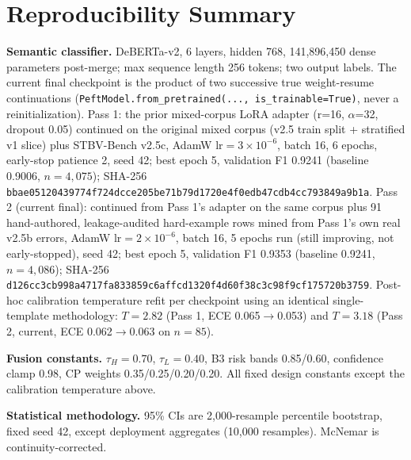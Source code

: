 \documentclass[conference]{IEEEtran}
\begin{document}
\section{Reproducibility Summary}
\label{app:params}
\textbf{Semantic classifier.} DeBERTa-v2, 6 layers, hidden 768, 141,896,450 dense parameters post-merge; max sequence length 256 tokens; two output labels. The current final checkpoint is the product of two successive true weight-resume continuations (\texttt{PeftModel.from\_pretrained(..., is\_trainable=True)}, never a reinitialization). Pass 1: the prior mixed-corpus LoRA adapter (r=16, $\alpha$=32, dropout 0.05) continued on the original mixed corpus (v2.5 train split + stratified v1 slice) plus STBV-Bench v2.5c, AdamW lr$=3\times10^{-6}$, batch 16, 6 epochs, early-stop patience 2, seed 42; best epoch 5, validation F1 0.9241 (baseline 0.9006, $n{=}4{,}075$); SHA-256 \texttt{bbae05120439774f724dcce205be71b79d1720e4f0edb47cdb4cc793849a9b1a}. Pass 2 (current final): continued from Pass 1's adapter on the same corpus plus 91 hand-authored, leakage-audited hard-example rows mined from Pass 1's own real v2.5b errors, AdamW lr$=2\times10^{-6}$, batch 16, 5 epochs run (still improving, not early-stopped), seed 42; best epoch 5, validation F1 0.9353 (baseline 0.9241, $n{=}4{,}086$); SHA-256 \texttt{d126cc3cb998a4717fa833859c6affcd1320f4d60f38c3c98f9cf175720b3759}. Post-hoc calibration temperature refit per checkpoint using an identical single-template methodology: $T{=}2.82$ (Pass 1, ECE 0.065$\to$0.053) and $T{=}3.18$ (Pass 2, current, ECE 0.062$\to$0.063 on $n{=}85$).

\textbf{Fusion constants.} $\tau_H{=}0.70$, $\tau_L{=}0.40$, B3 risk bands 0.85/0.60, confidence clamp 0.98, CP weights 0.35/0.25/0.20/0.20. All fixed design constants except the calibration temperature above.

\textbf{Statistical methodology.} 95\% CIs are 2,000-resample percentile bootstrap, fixed seed 42, except deployment aggregates (10,000 resamples). McNemar is continuity-corrected.

\end{document}
